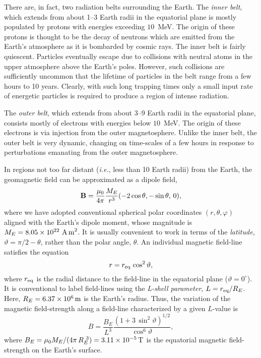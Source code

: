 There are, in fact, two radiation belts surrounding the Earth. The {\em inner
belt}, which extends from about 1--3 Earth radii in the equatorial plane
is mostly populated by protons with energies exceeding $10$~MeV. The origin of
these protons is thought to be the decay of neutrons which are emitted from
the Earth's atmosphere as it is bombarded by cosmic rays. The inner belt is fairly
quiescent. Particles eventually escape due to collisions with neutral atoms
in the upper atmosphere above the Earth's poles. However, such collisions
are sufficiently uncommon that the lifetime of particles in the belt  range
from a few hours to 10 years. Clearly, with such long trapping
times only a small input rate of energetic particles is required to produce a
region of intense radiation. 

The {\em outer belt}, which extends from about 3--9 Earth radii in the equatorial
plane, consists mostly of electrons with energies below $10$~MeV. The origin
of these electrons is via injection from the outer magnetosphere. Unlike the
inner belt, the outer belt is very dynamic, changing on time-scales of a few
hours in response to perturbations emanating from the outer magnetosphere. 

In regions not too far distant 
({\em i.e.}, less than 10 Earth radii) from the Earth, the geomagnetic field can be approximated
as a dipole field,
\begin{equation}\label{e2.81}
{\bf B} = \frac{\mu_0}{4\pi} \frac{M_E}{r^3} (-2\cos\theta, -\sin\theta, \,0),
\end{equation}
where we have adopted conventional spherical polar coordinates $(r,\theta,\varphi)$ aligned
with the Earth's dipole moment, whose magnitude is $M_E = 8.05\times 10^{22}~{\rm A\,m}^2$. It is usually convenient to work in terms of the {\em latitude}, $\vartheta
= \pi/2 - \theta$, rather than the polar angle, $\theta$. 
An individual magnetic  field-line satisfies the equation
\begin{equation}\label{e2.82}
r = r_{\rm eq}\,\cos^2\vartheta,
\end{equation}
where $r_{\rm eq}$ is the radial distance to the field-line in the equatorial
plane ($\vartheta=0^\circ$). It is conventional to label field-lines
using the {\em L-shell parameter}, $L=r_{\rm eq}/R_E$. Here, $R_E = 6.37\times 10^6\,{\rm m}$ is the Earth's radius. Thus, the variation of the
 magnetic field-strength along a field-line characterized by a given $L$-value
is
\begin{equation}\label{e2.83}
B = \frac{B_E}{L^3} \frac{(1+3\,\sin^2\vartheta)^{1/2}}{\cos^6\vartheta},
\end{equation}
where $B_E= \mu_0 M_E/(4\pi\, R_E^{~3}) = 3.11\times 10^{-5}\,{\rm T}$ is the
equatorial magnetic field-strength on the Earth's surface.

